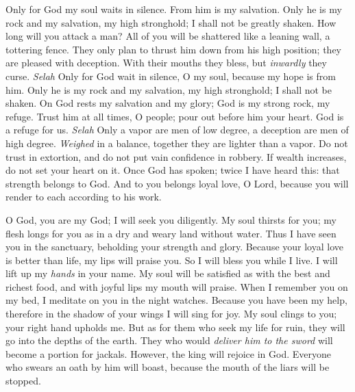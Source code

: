 \begin{biblechapter} %
 Only for God my soul waits in silence. 
From him is my salvation.
\verse Only he is my rock and my salvation, 
my high stronghold; I shall not be greatly shaken.
\verse How long will you attack a man? 
All of you will be shattered 
like a leaning wall, a tottering fence.
\verse They only plan to thrust him down from his high position; 
they are pleased with deception. 
With their mouths they bless, 
but \textit{inwardly} they curse. \textit{Selah}
\verse Only for God wait in silence, O my soul, 
because my hope is from him.
\verse Only he is my rock and my salvation, 
my high stronghold; I shall not be shaken.
\verse On God rests my salvation and my glory; 
God is my strong rock, my refuge.
\verse Trust him at all times, O people; 
pour out before him your heart. 
God is a refuge for us. \textit{Selah}
\verse Only a vapor are men of low degree, 
a deception are men of high degree. 
\textit{Weighed} in a balance, 
together they are lighter than a vapor.
\verse Do not trust in extortion, 
and do not put vain confidence in robbery. 
If wealth increases, 
do not set your heart on it.
\verse Once God has spoken; 
twice I have heard this: 
that strength belongs to God.
\verse And to you belongs loyal love, O Lord, 
because you will render to each according to his work.
\end{biblechapter}

\begin{biblechapter} %
 O God, you are my God; 
I will seek you diligently. 
My soul thirsts for you; my flesh longs for you 
as in a dry and weary land without water.
\verse Thus I have seen you in the sanctuary, 
beholding your strength and glory.
\verse Because your loyal love is better than life, 
my lips will praise you.
\verse So I will bless you while I live. 
I will lift up my \textit{hands} in your name.
\verse My soul will be satisfied as with the best and richest food, 
and with joyful lips my mouth will praise.
\verse When I remember you on my bed, 
I meditate on you in the night watches.
\verse Because you have been my help, 
therefore in the shadow of your wings I will sing for joy.
\verse My soul clings to you; 
your right hand upholds me.
\verse But as for them who seek my life for ruin, 
they will go into the depths of the earth.
\verse They who would \textit{deliver him to the sword} 
will become a portion for jackals.
\verse However, the king will rejoice in God. 
Everyone who swears an oath by him will boast, 
because the mouth of the liars will be stopped.
\end{biblechapter}

